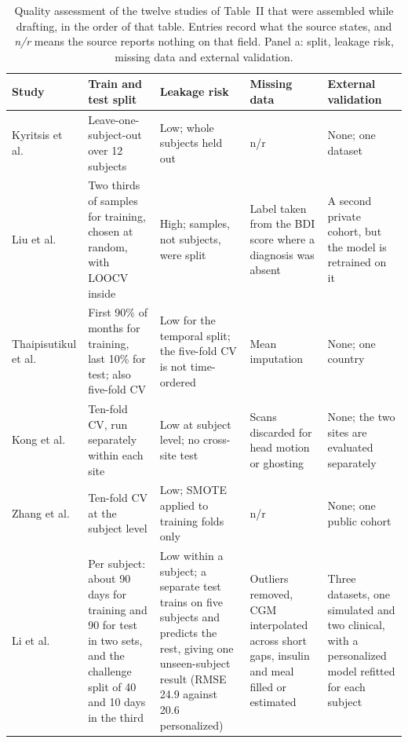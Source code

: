 \documentclass[journal]{IEEEtran}
\renewcommand{\thetable}{S\arabic{table}}
\begin{document}
\begin{table}[tbp]
\centering
\renewcommand{\thetable}{S3a}
\caption{Quality assessment of the twelve studies of Table~II that were assembled while drafting,
in the order of that table. Entries record what the source states, and \emph{n/r}
means the source reports nothing on that field. Panel a: split, leakage risk, missing data and external validation.}
\label{tab:S3a}
\footnotesize
\setlength{\tabcolsep}{2.5pt}
\renewcommand{\arraystretch}{1.05}
\begin{tabularx}{\textwidth}{L{2.6cm} L{3.6cm} L{3.2cm} L{3.4cm} X}
\toprule
\textbf{Study} & \textbf{Train and test split} & \textbf{Leakage risk} & \textbf{Missing data} & \textbf{External validation} \\
\midrule
Kyritsis et al.~\cite{Kyritsis2019EatingBehavior} & Leave-one-subject-out over 12 subjects & Low; whole subjects held out & n/r & None; one dataset \\
\addlinespace[2pt]
Liu et al.~\cite{2} & Two thirds of samples for training, chosen at random, with LOOCV inside & High; samples, not subjects, were split & Label taken from the BDI score where a diagnosis was absent & A second private cohort, but the model is retrained on it \\
\addlinespace[2pt]
Thaipisutikul et al.~\cite{3} & First 90\% of months for training, last 10\% for test; also five-fold CV & Low for the temporal split; the five-fold CV is not time-ordered & Mean imputation & None; one country \\
\addlinespace[2pt]
Kong et al.~\cite{4} & Ten-fold CV, run separately within each site & Low at subject level; no cross-site test & Scans discarded for head motion or ghosting & None; the two sites are evaluated separately \\
\addlinespace[2pt]
Zhang et al.~\cite{9} & Ten-fold CV at the subject level & Low; SMOTE applied to training folds only & n/r & None; one public cohort \\
\addlinespace[2pt]
Li et al.~\cite{Li2020GluNet} & Per subject: about 90 days for training and 90 for test in two sets, and the challenge split of 40 and 10 days in the third & Low within a subject; a separate test trains on five subjects and predicts the rest, giving one unseen-subject result (RMSE 24.9 against 20.6 personalized) & Outliers removed, CGM interpolated across short gaps, insulin and meal filled or estimated & Three datasets, one simulated and two clinical, with a personalized model refitted for each subject \\

\end{tabularx}
\end{table}
\end{document}
